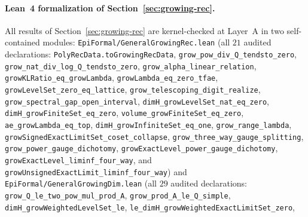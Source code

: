 \paragraph{Lean~4 formalization of Section~\ref{sec:growing-rec}.}
All results of Section~\ref{sec:growing-rec} are kernel-checked at Layer~A in two
self-contained modules:
\texttt{EpiFormal/\allowbreak General\allowbreak Growing\allowbreak Rec.lean}
(all $21$ audited declarations: \texttt{PolyRecData.\allowbreak toGrowingRecData},
\texttt{grow\_\allowbreak pow\_\allowbreak div\_\allowbreak Q\_\allowbreak tendsto\_\allowbreak zero},
\texttt{grow\_\allowbreak nat\_\allowbreak div\_\allowbreak log\_\allowbreak Q\_\allowbreak tendsto\_\allowbreak zero},
\texttt{grow\_\allowbreak alpha\_\allowbreak linear\_\allowbreak relation},
\texttt{growKLRatio\_\allowbreak eq\_\allowbreak growLambda},
\texttt{growLambda\_\allowbreak eq\_\allowbreak zero\_\allowbreak tfae},
\texttt{growLevelSet\_\allowbreak zero\_\allowbreak eq\_\allowbreak lattice},
\texttt{grow\_\allowbreak telescoping\_\allowbreak digit\_\allowbreak realize},
\texttt{grow\_\allowbreak spectral\_\allowbreak gap\_\allowbreak open\_\allowbreak interval},
\texttt{dimH\_\allowbreak growLevelSet\_\allowbreak nat\_\allowbreak eq\_\allowbreak zero},
\texttt{dimH\_\allowbreak growFiniteSet\_\allowbreak eq\_\allowbreak zero},
\texttt{volume\_\allowbreak growFiniteSet\_\allowbreak eq\_\allowbreak zero},
\texttt{ae\_\allowbreak growLambda\_\allowbreak eq\_\allowbreak top},
\texttt{dimH\_\allowbreak growInfiniteSet\_\allowbreak eq\_\allowbreak one},
\texttt{grow\_\allowbreak range\_\allowbreak lambda},
\texttt{growSignedExactLimitSet\_\allowbreak coset\_\allowbreak collapse},
\texttt{grow\_\allowbreak three\_\allowbreak way\_\allowbreak gauge\_\allowbreak splitting},
\texttt{grow\_\allowbreak power\_\allowbreak gauge\_\allowbreak dichotomy},
\texttt{growExactLevel\_\allowbreak power\_\allowbreak gauge\_\allowbreak dichotomy},
\texttt{growExactLevel\_\allowbreak liminf\_\allowbreak four\_\allowbreak way}, and
\texttt{growUnsignedExactLimit\_\allowbreak liminf\_\allowbreak four\_\allowbreak way}) and
\texttt{EpiFormal/\allowbreak General\allowbreak Growing\allowbreak Dim.lean}
(all $29$ audited declarations:
\texttt{grow\_\allowbreak Q\_\allowbreak le\_\allowbreak two\_\allowbreak pow\_\allowbreak mul\_\allowbreak prod\_\allowbreak A},
\texttt{grow\_\allowbreak prod\_\allowbreak A\_\allowbreak le\_\allowbreak Q\_\allowbreak simple},
\texttt{dimH\_\allowbreak grow\allowbreak Weighted\allowbreak LevelSet\_\allowbreak le},
\texttt{le\_\allowbreak dimH\_\allowbreak grow\allowbreak Weighted\allowbreak ExactLimitSet\_\allowbreak zero},
